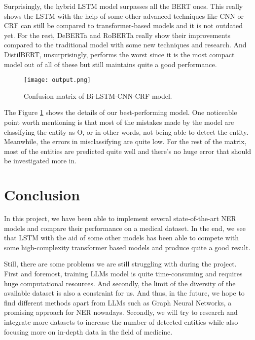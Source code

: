 \documentclass[conference]{IEEEtran}
\begin{document}
Surprisingly, the hybrid LSTM model surpasses all the BERT ones. This really shows the
LSTM with the help of some other advanced techniques like CNN or CRF can still be
compared to transformer-based models and it is not outdated yet. For the rest, DeBERTa
and RoBERTa really show their improvements compared to the traditional model with some
new techniques and research. And DistilBERT, unsurprisingly, performs the worst since
it is the most compact model out of all of these but still maintains quite a good performance.

\begin{figure}[h!]
    \centering
    \texttt{[image: output.png]}
    \caption{Confusion matrix of Bi-LSTM-CNN-CRF model.}
    \label{fig7}
\end{figure}
The Figure \ref{fig7} shows the details of our best-performing model. One noticeable
point worth mentioning is that most of the mistakes made by the model are classifying
the entity as O, or in other words, not being able to detect the entity. Meanwhile, the
errors in misclassifying are quite low. For the rest of the matrix, most of the
entities are predicted quite well and there's no huge error that should be investigated more in.

\vspace{4mm}
\section{Conclusion}
In this project, we have been able to implement several state-of-the-art NER models and
compare their performance on a medical dataset. In the end, we see that LSTM with the
aid of some other models has been able to compete with some high-complexity transformer
based models and produce quite a good result.

\indent Still, there are some problems we are still struggling with during the project.
First and foremost, training LLMs model is quite time-consuming and requires huge
computational resources. And secondly, the limit of the diversity of the available
dataset is also a constraint for us. And thus, in the future, we hope to find different
methods apart from LLMs such as Graph Neural Networks, a promising approach for NER
nowadays. Secondly, we will try to research and integrate more datasets to increase the
number of detected entities while also focusing more on in-depth data in the field of medicine.

\vspace{4mm}
\printbibliography
\end{document}
